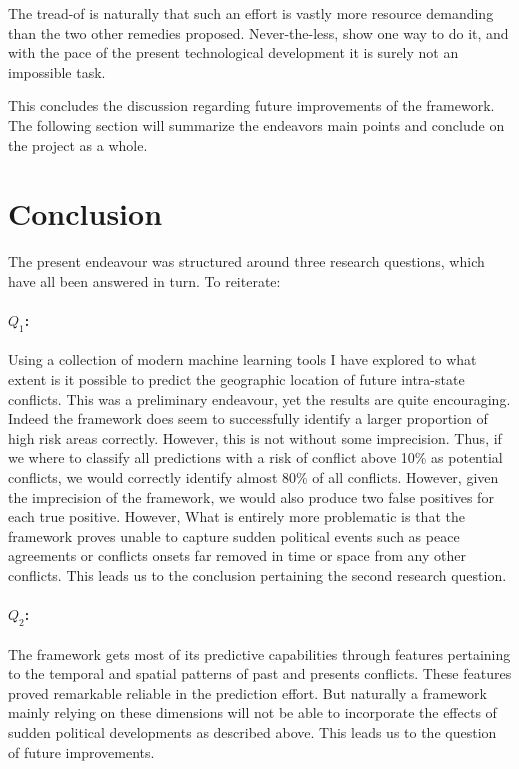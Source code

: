 \documentclass[a4paper]{article}
\begin{document}
The tread-of is naturally that such an effort is vastly more resource demanding than the two other remedies proposed. Never-the-less, \cite{mueller_2016} show one way to do it, and with the pace of the present technological development it is surely not an impossible task.\par 

This concludes the discussion regarding future improvements of the framework. The following section will summarize the endeavors main points and conclude on the project as a whole.\par

\section{Conclusion}

The present endeavour was structured around three research questions, which have all been answered in turn. To reiterate:

\paragraph{$Q_1$:} Using a collection of modern machine learning tools I have explored to what extent is it possible to predict the geographic location of future intra-state conflicts. This was a preliminary endeavour, yet the results are quite encouraging. Indeed the framework does seem to successfully identify a larger proportion of high risk areas correctly. However, this is not without some imprecision. Thus, if we where to classify all predictions with a risk of conflict above 10\% as potential conflicts, we would correctly identify almost 80\% of all conflicts. However, given the imprecision of the framework, we would also produce two false positives for each true positive. However, What is entirely more problematic is that the framework proves unable to capture sudden political events such as peace agreements or conflicts onsets far removed in time or space from any other conflicts. This leads us to the conclusion pertaining the second research question.\par

\paragraph{$Q_2$:} The framework gets most of its predictive capabilities through features pertaining to the temporal and spatial patterns of past and presents conflicts. These features proved remarkable reliable in the prediction effort. But naturally a framework mainly relying on these dimensions will not be able to incorporate the effects of sudden political developments as described above. This leads us to the question of future improvements.\par 
\end{document}
